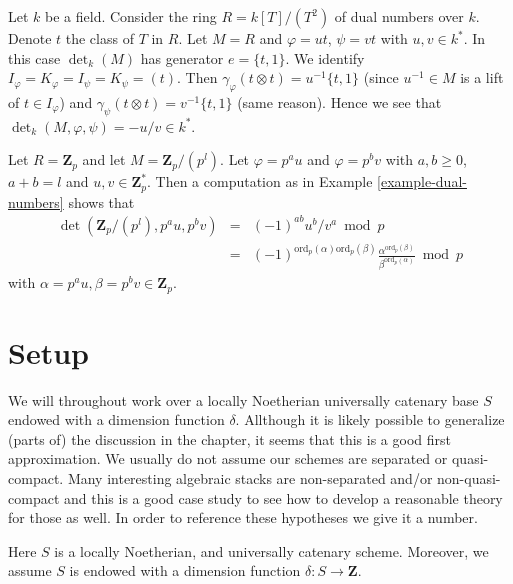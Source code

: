 \begin{example}
\label{example-dual-numbers}
Let $k$ be a field.
Consider the ring $R = k[T]/(T^2)$ of dual numbers over $k$.
Denote $t$ the class of $T$ in $R$.
Let $M = R$ and $\varphi = ut$, $\psi = vt$ with $u, v \in k^*$.
In this case $\det_k(M)$ has generator $e = \{t, 1\}$.
We identify $I_\varphi = K_\varphi = I_\psi = K_\psi = (t)$.
Then $\gamma_\varphi(t \otimes t) = u^{-1}\{t, 1\}$
(since $u^{-1} \in M$ is a lift of $t \in I_\varphi$)
and $\gamma_\psi(t \otimes t) = v^{-1}\{t, 1\}$ (same reason).
Hence we see that $\det_k(M, \varphi, \psi) = -u/v \in k^*$.
\end{example}

\begin{example}
\label{example-Zp}
Let $R = \mathbf{Z}_p$ and let $M = \mathbf{Z}_p/(p^l)$.
Let $\varphi = p^a u$ and $\varphi = p^b v$ with $a, b \geq 0$,
$a + b = l$ and $u, v \in \mathbf{Z}_p^*$.
Then a computation as in Example \ref{example-dual-numbers}
shows that
\begin{eqnarray*}
\det(\mathbf{Z}_p/(p^l), p^au, p^bv) & = &
(-1)^{ab}u^b/v^a \bmod p \\
& = &
(-1)^{\text{ord}_p(\alpha)\text{ord}_p(\beta)}
\frac{\alpha^{\text{ord}_p(\beta)}}{\beta^{\text{ord}_p(\alpha)}} \bmod p
\end{eqnarray*}
with $\alpha = p^au, \beta = p^bv \in \mathbf{Z}_p$.
\end{example}


\section{Setup}
\label{section-setup}

\noindent
We will throughout work over a locally Noetherian universally
catenary base $S$ endowed with a dimension function $\delta$.
Allthough it is likely possible to generalize (parts of) the
discussion in the chapter, it seems that this is a good first
approximation. We usually do not assume our schemes are
separated or quasi-compact. Many interesting algebraic stacks
are non-separated and/or non-quasi-compact and this is a good
case study to see how to develop a reasonable theory for those as well.
In order to reference these hypotheses we give it a number.

\begin{situation}
\label{situation-setup}
Here $S$ is a locally Noetherian, and universally catenary scheme.
Moreover, we assume $S$ is endowed with a dimension function
$\delta : S \longrightarrow \mathbf{Z}$.
\end{situation}

